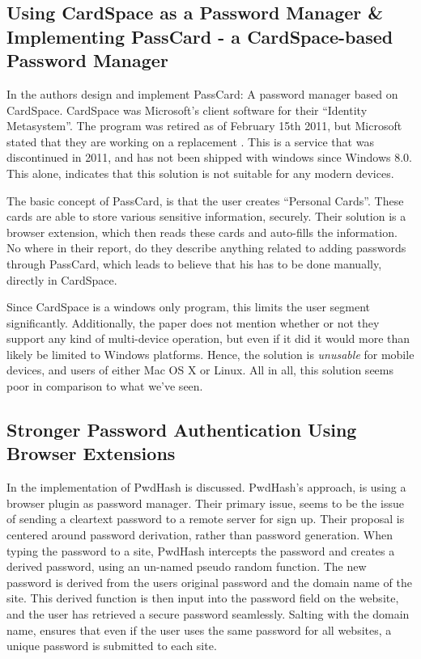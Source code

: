 		\subsection*{Using CardSpace as a Password Manager \& Implementing PassCard - a CardSpace-based Password Manager}
			In \cite{cardspace,cardspace_impl} the authors design and implement PassCard: A password manager based on CardSpace. CardSpace was Microsoft's client software for their ``Identity Metasystem''. The program was retired as of February 15th 2011, but Microsoft stated that they are working on a replacement \cite{cardspace_cancelled}. This is a service that was discontinued in 2011, and has not been shipped with windows since Windows 8.0. This alone, indicates that this solution is not suitable for any modern devices.

			The basic concept of PassCard, is that the user creates ``Personal Cards''. These cards are able to store various sensitive information, securely. Their solution is a browser extension, which then reads these cards and auto-fills the information. No where in their report, do they describe anything related to adding passwords through PassCard, which leads to believe that his has to be done manually, directly in CardSpace.

			Since CardSpace is a windows only program, this limits the user segment significantly. Additionally, the paper does not mention whether or not they support any kind of multi-device operation, but even if it did it would more than likely be limited to Windows platforms. Hence, the solution is \emph{unusable} for mobile devices, and users of either Mac OS X or Linux. All in all, this solution seems poor in comparison to what we've seen.

		\subsection*{Stronger Password Authentication Using Browser Extensions}
			In \cite{pwdhash} the implementation of PwdHash is discussed. PwdHash's approach, is using a browser plugin as password manager. Their primary issue, seems to be the issue of sending a cleartext password to a remote server for sign up. Their proposal is centered around password derivation, rather than password generation. When typing the password to a site, PwdHash intercepts the password and creates a derived password, using an un-named pseudo random function. The new password is derived from the users original password and the domain name of the site. This derived function is then input into the password field on the website, and the user has retrieved a secure password seamlessly. Salting with the domain name, ensures that even if the user uses the same password for all websites, a unique password is submitted to each site.

